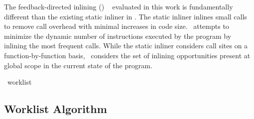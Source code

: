 
The feedback-directed inlining (\FDI) ~\cite{BerubePhD} evaluated in this work is
fundamentally different than the existing static inliner in \llvm.
The static inliner inlines small calls to remove call overhead with
minimal increases in code size.  \FDI\ attempts to minimize the
dynamic number of instructions executed by the program by inlining the
most frequent calls.  While the static inliner considers call sites on
a function-by-function basis, \FDI\ considers the set of inlining
opportunities present at global scope in the current state of the
program.

\begin{algorithm}[t!p]
\begin{small}
  
\end{small}
  \caption{\FDI\ worklist}
  \label{alg:fdiworklist}
\end{algorithm}

\subsection{Worklist Algorithm}

